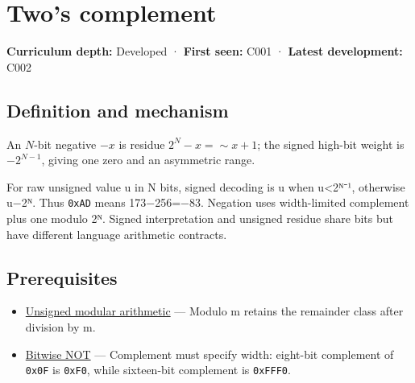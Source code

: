 \hypertarget{appendix-4fbc03d20829}{}\label{referencestart:appendix-4fbc03d20829}
\section{Two's complement}\label{appendix-4fbc03d20829-twos-complement}

\hypertarget{appendix-4fbc03d20829-twos-complement}{}

\textbf{Curriculum depth:} Developed · \textbf{First seen:} C001 · \textbf{Latest development:} C002

\begin{allmightroledefinition}

\subsection{Definition and mechanism}\label{appendix-4fbc03d20829-definition-and-mechanism}

\hypertarget{appendix-4fbc03d20829-definition-and-mechanism}{}

An \(N\)-bit negative \(-x\) is residue \(2^N-x=\sim x+1\); the signed high-bit weight is \(-2^{N-1}\), giving one zero and an asymmetric range.

\end{allmightroledefinition}

For raw unsigned value u in N bits, signed decoding is u when u\textless2ᴺ⁻¹, otherwise u−2ᴺ. Thus \texttt{0xAD} means 173−256=−83. Negation uses width-limited complement plus one modulo 2ᴺ. Signed interpretation and unsigned residue share bits but have different language arithmetic contracts.

\subsection{Prerequisites}\label{appendix-4fbc03d20829-prerequisites}

\hypertarget{appendix-4fbc03d20829-prerequisites}{}

\begin{itemize}
\tightlist
\item
  \hyperref[appendix-c99977d88b33]{Unsigned modular arithmetic} --- Modulo m retains the remainder class after division by m.
\item
  \hyperref[appendix-8f38927cfc54]{Bitwise NOT} --- Complement must specify width: eight-bit complement of \texttt{0x0F} is \texttt{0xF0}, while sixteen-bit complement is \texttt{0xFFF0}.
\end{itemize}

